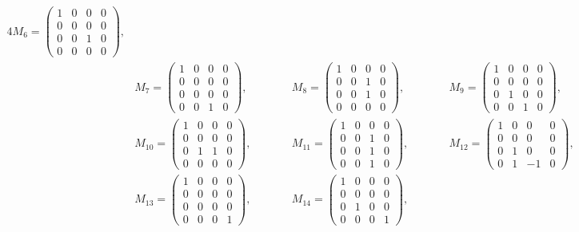 \documentclass[10pt,a4paper]{amsart}
\numberwithin{equation}{section}
\begin{document}
\begin{Example}
\begin{enumerate}
\begin{alignat*}{4}
M_6=\begin{pmatrix}1&0&0&0\\0&0&0&0\\0&0&1&0\\0&0&0&0\end{pmatrix},&\\
&M_7=\begin{pmatrix}1&0&0&0\\0&0&0&0\\0&0&0&0\\0&0&1&0\end{pmatrix},\qquad&&
M_8=\begin{pmatrix}1&0&0&0\\0&0&1&0\\0&0&1&0\\0&0&0&0\end{pmatrix},\qquad&&
M_9=\begin{pmatrix}1&0&0&0\\0&0&0&0\\0&1&0&0\\0&0&1&0\end{pmatrix},&\\
&M_{10}=\begin{pmatrix}1&0&0&0\\0&0&0&0\\0&1&1&0\\0&0&0&0\end{pmatrix},\qquad&&
M_{11}=\begin{pmatrix}1&0&0&0\\0&0&1&0\\0&0&1&0\\0&0&1&0\end{pmatrix},\qquad&&
M_{12}=\begin{pmatrix}1&0&0&0\\0&0&0&0\\0&1&0&0\\0&1&-1&0\end{pmatrix},&\\
&M_{13}=\begin{pmatrix}1&0&0&0\\0&0&0&0\\0&0&0&0\\0&0&0&1\end{pmatrix},\qquad&&
M_{14}=\begin{pmatrix}1&0&0&0\\0&0&0&0\\0&1&0&0\\0&0&0&1\end{pmatrix},\qquad&&

\end{alignat*}
\end{enumerate}
\end{Example}
\end{document}

